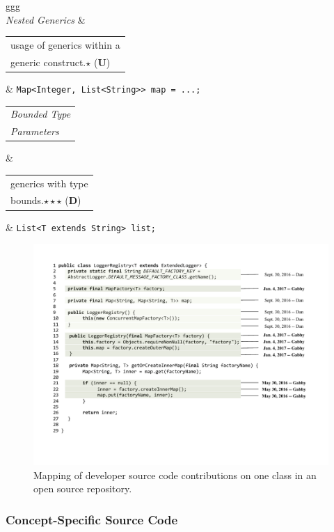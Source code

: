 \begin{table}
\begin{tabular}{ggg}
		\\
	    \textit{Nested Generics}        & \begin{tabular}[c]{@{}l@{}}usage of generics within a \\generic construct.\textbf{$\star$} (\textbf{U}) \end{tabular}                                                                              & \small{\texttt{Map<Integer, List<String>> map = ...;}} \\
		\begin{tabular}[c]{@{}l@{}}\textit{Bounded Type} \\\textit{Parameters} \end{tabular}  & \begin{tabular}[c]{@{}l@{}}generics with type \\bounds.\textbf{$\star\star\star$}  (\textbf{D}) \end{tabular}                                                                                               & \small{\texttt{List<T extends String> list;}}                             \\
		\bottomrule
	\end{tabular}
\end{table}

\begin{figure} [ht]
	\centering
	\includegraphics[width=4.5in]{Chapter-6/figs/code.pdf}
	\caption{Mapping of developer source code contributions on one class in an open source repository.}
	\label{fig:code}
\end{figure}

\subsubsection{Concept-Specific Source Code}

